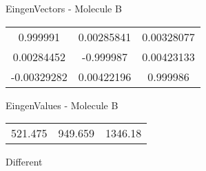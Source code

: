 \begin{multicols}{2}
\begin{center}
\vtab
 EingenVectors - Molecule B     \\
\vtab
\begin{tabular}{|c c c|}
0.999991	 & 	0.00285841	 & 	0.00328077	 \\
0.00284452	 & 	-0.999987	 & 	0.00423133	 \\
-0.00329282	 & 	0.00422196	 & 	0.999986
\end{tabular}

\vtab
 EingenValues - Molecule B     \\
\vtab
\begin{tabular}{|c c c|}
521.475	 & 	949.659	 & 	1346.18	 \\
\end{tabular}

\end{center}
\end{multicols}
\begin{center}
\vtab
\vtab
\textcolor{NavyBlue}{\Large Different}
\end{center}

 \newpage

